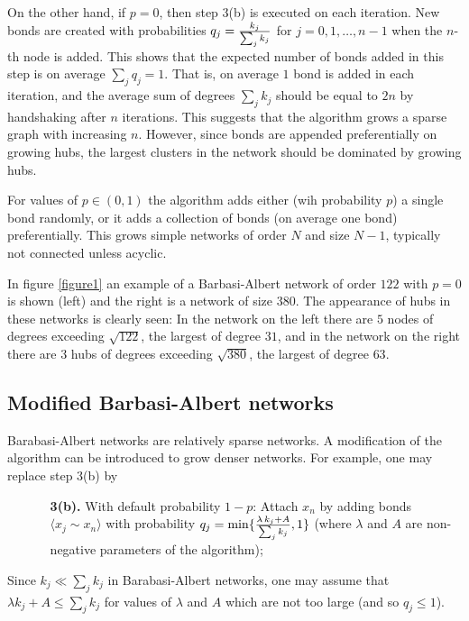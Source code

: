 \documentclass[12pt]{iopart}
\def\edge#1#2{{\langle #1{\sim}#2 \rangle}}
\def\sfrac#1#2{\hbox{\normalsize $\frac{#1}{#2}$}}
\begin{document}
On the other hand, if $p=0$, then step 3(b) is executed on each iteration.
New bonds are created with probabilities $q_j=\sfrac{k_j}{\sum_j k_j}$ for
$j=0,1,\ldots,n-1$ when the $n$-th node is added.  This shows that 
the expected number of bonds added in this step is on average
$\sum_j q_j = 1$.  That is, on average $1$ bond is added in each iteration, and the average
sum of degrees $\sum_j k_j$ should be equal to $2n$ by handshaking after $n$ iterations.  
This suggests that the algorithm grows a sparse graph with increasing $n$.  
However, since bonds are appended preferentially on growing hubs, 
the largest clusters in the network should be dominated by growing hubs.

For values of $p\in(0,1)$ the algorithm adds either (wih probability $p$) a single bond 
randomly, or it adds a collection of bonds (on average one bond) preferentially.  This 
grows simple networks of order $N$ and size $N-1$, typically not connected
unless acyclic.

In figure \ref{figure1} an example of a Barbasi-Albert network of order $122$ 
with $p=0$ is shown (left) and the right is a network of size $380$. The appearance of
hubs in these networks is clearly seen:  In the network on the left there are $5$
nodes of degrees exceeding $\sqrt{122}$, the largest of degree $31$,
and in the network on the right there are $3$ hubs of degrees exceeding $\sqrt{380}$,
the largest of degree $63$.




\subsection{Modified Barbasi-Albert networks}
Barabasi-Albert networks are relatively sparse networks.  A modification of
the algorithm can be introduced to grow denser networks.  For example,
one may replace step 3(b) by

\begin{enumerate}
\item[\bf ] 
\begin{enumerate}
\item[\bf 3(b).] With default probability $1-p$: Attach $x_n$ by adding bonds
$\edge{x_j}{x_n}$ with probability $q_j=\min\{\sfrac{\lambda\,k_j+A}{\sum_j k_j},1\}$
(where $\lambda$ and $A$ are non-negative parameters of the algorithm);
\end{enumerate}
\end{enumerate}

Since $k_j \ll \sum_j k_j$ in Barabasi-Albert networks, one may assume that
$\lambda k_j + A \leq \sum_j k_j$ for values of $\lambda$ and $A$ which 
are not too large (and so $q_j \leq 1$).  
\end{document}

